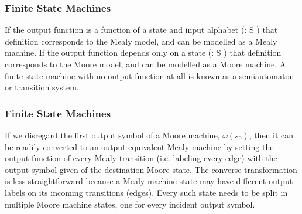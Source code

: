 \begin{frame}
	\frametitle{Finite State Machines}
If the output function is a function of a state and input alphabet (\omega: S \times \Sigma \rightarrow \Gamma) that definition corresponds to the Mealy model, and can be modelled as a Mealy machine. If the output function depends only on a state (\omega: S \rightarrow \Gamma) that definition corresponds to the Moore model, and can be modelled as a Moore machine. A finite-state machine with no output function at all is known as a semiautomaton or transition system.

\end{frame}
\begin{frame}
	\frametitle{Finite State Machines}
	If we disregard the first output symbol of a Moore machine, $\omega (s_0)$, then it can be readily converted to an output-equivalent Mealy machine by setting the output function of every Mealy transition (i.e. labeling every edge) with the output symbol given of the destination Moore state. The converse transformation is less straightforward because a Mealy machine state may have different output labels on its incoming transitions (edges). Every such state needs to be split in multiple Moore machine states, one for every incident output symbol.

\end{frame}

